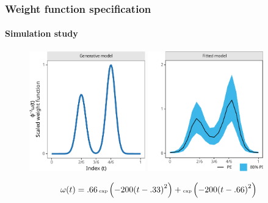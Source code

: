 \documentclass{snedecorbeamer}
\begin{document}
\begin{frame}
  \frametitle{Weight function specification}
  \framesubtitle{Simulation study}
  \begin{figure}
    \centering
    \includegraphics[height=14em]{inc/sim_truth_bim_fsc070.pdf}
    \includegraphics[height=14em]{inc/sim_posterior_bim_fsc070.pdf}
  \end{figure}
  \begin{equation}
    \tiny
    \omega(t)
    =.66\,\text{exp}\left(-200 {(t - .33)}^2\right) +
    \text{exp}\left(-200 {(t - .66)}^2\right)
  \end{equation}

\end{frame}
\end{document}
